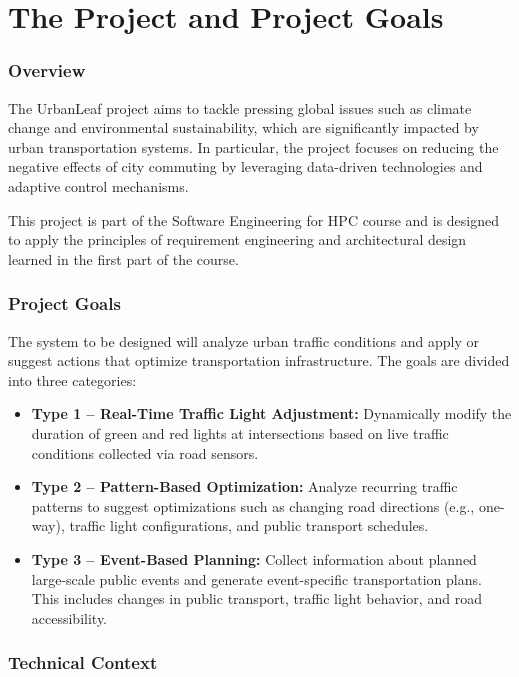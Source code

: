 \chapter{The Project and Project Goals}

\subsection{Overview}

The UrbanLeaf project aims to tackle pressing global issues such as climate change and environmental sustainability, which are significantly impacted by urban transportation systems. In particular, the project focuses on reducing the negative effects of city commuting by leveraging data-driven technologies and adaptive control mechanisms.

This project is part of the Software Engineering for HPC course and is designed to apply the principles of requirement engineering and architectural design learned in the first part of the course.

\subsection{Project Goals}

The system to be designed will analyze urban traffic conditions and apply or suggest actions that optimize transportation infrastructure. The goals are divided into three categories:

\begin{itemize}
    \item \textbf{Type 1 – Real-Time Traffic Light Adjustment:} Dynamically modify the duration of green and red lights at intersections based on live traffic conditions collected via road sensors.
    
    \item \textbf{Type 2 – Pattern-Based Optimization:} Analyze recurring traffic patterns to suggest optimizations such as changing road directions (e.g., one-way), traffic light configurations, and public transport schedules.
    
    \item \textbf{Type 3 – Event-Based Planning:} Collect information about planned large-scale public events and generate event-specific transportation plans. This includes changes in public transport, traffic light behavior, and road accessibility.
\end{itemize}

\subsection{Technical Context}

